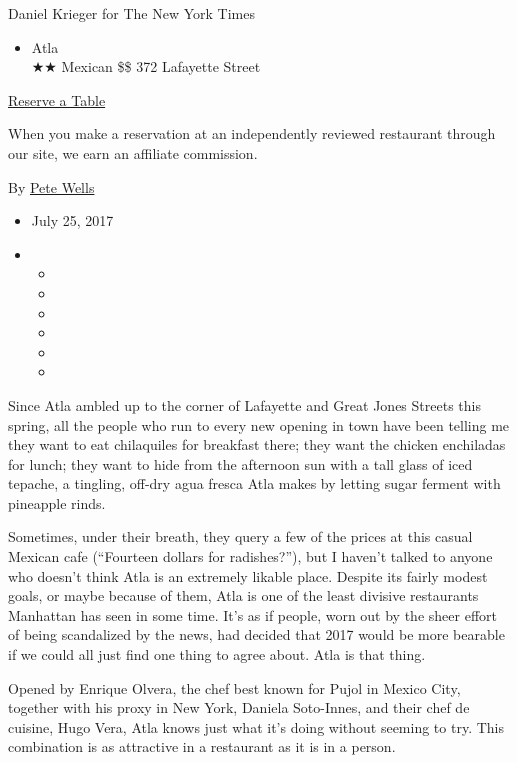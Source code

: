 Daniel Krieger for The New York Times

\begin{itemize}
\tightlist
\item
  Atla\\
  ★★ Mexican \$\$ 372 Lafayette Street
\end{itemize}

\href{https://resy.com/cities/ny/atla?utm_source=nyt\&utm_medium=restoprofile\&utm_campaign=affiliates\&aff_id=c1fe784}{Reserve
a Table}

When you make a reservation at an independently reviewed restaurant
through our site, we earn an affiliate commission.

By \href{http://www.nytimes3xbfgragh.onion/by/pete-wells}{Pete Wells}

\begin{itemize}
\item
  July 25, 2017
\item
  \begin{itemize}
  \item
  \item
  \item
  \item
  \item
  \item
  \end{itemize}
\end{itemize}

Since Atla ambled up to the corner of Lafayette and Great Jones Streets
this spring, all the people who run to every new opening in town have
been telling me they want to eat chilaquiles for breakfast there; they
want the chicken enchiladas for lunch; they want to hide from the
afternoon sun with a tall glass of iced tepache, a tingling, off-dry
agua fresca Atla makes by letting sugar ferment with pineapple rinds.

Sometimes, under their breath, they query a few of the prices at this
casual Mexican cafe (``Fourteen dollars for radishes?''), but I haven't
talked to anyone who doesn't think Atla is an extremely likable place.
Despite its fairly modest goals, or maybe because of them, Atla is one
of the least divisive restaurants Manhattan has seen in some time. It's
as if people, worn out by the sheer effort of being scandalized by the
news, had decided that 2017 would be more bearable if we could all just
find one thing to agree about. Atla is that thing.

Opened by Enrique Olvera, the chef best known for Pujol in Mexico City,
together with his proxy in New York, Daniela Soto-Innes, and their chef
de cuisine, Hugo Vera, Atla knows just what it's doing without seeming
to try. This combination is as attractive in a restaurant as it is in a
person.


